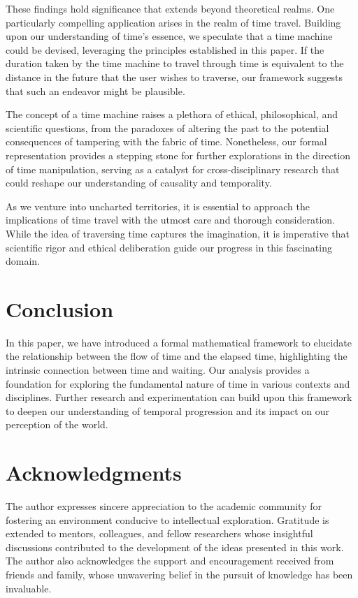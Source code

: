 \documentclass{article}
\begin{document}
These findings hold significance that extends beyond theoretical realms. One particularly compelling application arises in the realm of time travel. Building upon our understanding of time's essence, we speculate that a time machine could be devised, leveraging the principles established in this paper. If the duration taken by the time machine to travel through time is equivalent to the distance in the future that the user wishes to traverse, our framework suggests that such an endeavor might be plausible.

The concept of a time machine raises a plethora of ethical, philosophical, and scientific questions, from the paradoxes of altering the past to the potential consequences of tampering with the fabric of time. Nonetheless, our formal representation provides a stepping stone for further explorations in the direction of time manipulation, serving as a catalyst for cross-disciplinary research that could reshape our understanding of causality and temporality.

As we venture into uncharted territories, it is essential to approach the implications of time travel with the utmost care and thorough consideration. While the idea of traversing time captures the imagination, it is imperative that scientific rigor and ethical deliberation guide our progress in this fascinating domain.

\section{Conclusion}

In this paper, we have introduced a formal mathematical framework to elucidate the relationship between the flow of time and the elapsed time, highlighting the intrinsic connection between time and waiting. Our analysis provides a foundation for exploring the fundamental nature of time in various contexts and disciplines. Further research and experimentation can build upon this framework to deepen our understanding of temporal progression and its impact on our perception of the world.


\section*{Acknowledgments}
The author expresses sincere appreciation to the academic community for fostering an environment conducive to intellectual exploration. Gratitude is extended to mentors, colleagues, and fellow researchers whose insightful discussions contributed to the development of the ideas presented in this work. The author also acknowledges the support and encouragement received from friends and family, whose unwavering belief in the pursuit of knowledge has been invaluable.
\end{document}
